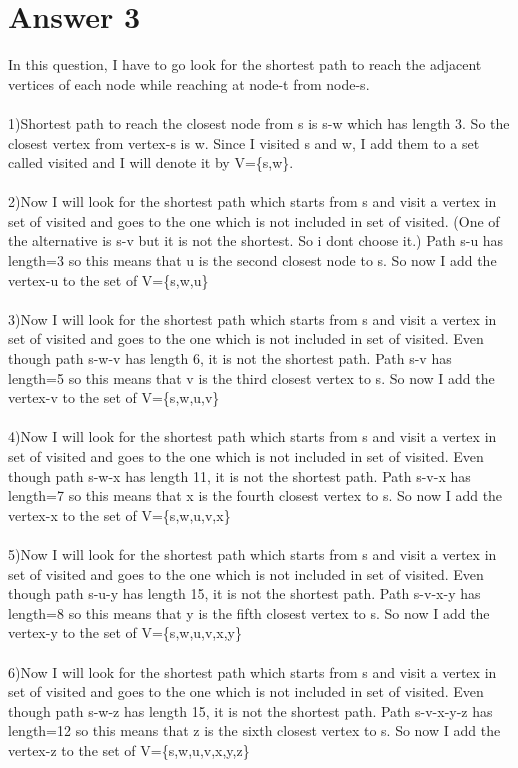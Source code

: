 \documentclass[12pt]{article}
\begin{document}
\section*{Answer 3}
In this question, I have to go look for the shortest path to reach the adjacent vertices of each node while reaching at node-t from node-s.\\\\
1)Shortest path to reach the closest node from s is s-w which has length 3. So the closest vertex from vertex-s is w. Since I visited s and w, I add them to a set called visited and I will denote it by V=\{s,w\}.\\\\
2)Now I will look for the shortest path which starts from s and visit a vertex in set of visited and goes to the one which is not included in set of visited. (One of the alternative is s-v but it is not the shortest. So i dont choose it.) Path s-u has length=3 so this means that u is the second closest node to s. So now I add the vertex-u to the set of V=\{s,w,u\}\\\\
3)Now I will look for the shortest path which starts from s and visit a vertex in set of visited and goes to the one which is not included in set of visited. Even though path s-w-v has length 6, it is not the shortest path. Path s-v has length=5 so this means that v is the third closest vertex to s. So now I add the vertex-v to the set of V=\{s,w,u,v\}\\\\
4)Now I will look for the shortest path which starts from s and visit a vertex in set of visited and goes to the one which is not included in set of visited. Even though path s-w-x has length 11, it is not the shortest path. Path s-v-x has length=7 so this means that x is the fourth closest vertex to s. So now I add the vertex-x to the set of V=\{s,w,u,v,x\}\\\\
5)Now I will look for the shortest path which starts from s and visit a vertex in set of visited and goes to the one which is not included in set of visited. Even though path s-u-y has length 15, it is not the shortest path. Path s-v-x-y has length=8 so this means that y is the fifth closest vertex to s. So now I add the vertex-y to the set of V=\{s,w,u,v,x,y\}\\\\
6)Now I will look for the shortest path which starts from s and visit a vertex in set of visited and goes to the one which is not included in set of visited. Even though path s-w-z has length 15, it is not the shortest path. Path s-v-x-y-z has length=12 so this means that z is the sixth closest vertex to s. So now I add the vertex-z to the set of V=\{s,w,u,v,x,y,z\}\\\\
\end{document}
